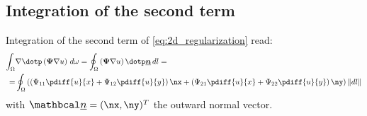 \subsection{Integration of the second term}
Integration of the second term of \autoref{eq:2d_regularization} read:
\begin{align}
    \int_\Omega & \nabla \dotp \left( \mat{\Psi} \nabla u \right) \, d\omega  =
    \oint_{\Omega}  \left(  \mat{\Psi} \nabla u \right) \dotp \vec{n}\, dl =
    \\
    = & \oint_{\Omega} \left(
    \left( \Psi_{11} \pdiff{{u}}{x} + \Psi_{12} \pdiff{{u}}{y}  \right) \nx
    + \left( \Psi_{21} \pdiff{{u}}{x} + \Psi_{22} \pdiff{{u}}{y}  \right) \ny
    \right) \norm{dl}
\end{align}
with $\vecn = (\nx, \ny)^T$ the outward normal vector.

